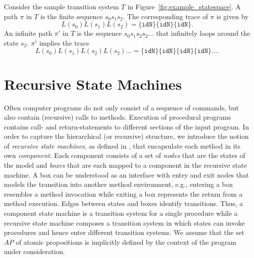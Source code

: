 \documentclass[a4paper, 12pt, twoside]{report}
\begin{document}
	Consider the sample transition system $T$ in Figure~\ref{fig:example_statespace}. A path $\pi$ in $T$ is the finite sequence $s_0s_1s_2$. The corresponding trace of $\pi$ is given by \[L(s_0)L(s_1)L(s_2) = \{\texttt{idN}\}\{\texttt{idN}\}\{\texttt{idN}\}.\] 
	An infinite path $\pi'$ in $T$ is the sequence $s_0s_1s_2s_2\dots$ that infinitely loops around the state $s_2$. $\pi'$ implies the trace  
	\[L(s_0)L(s_1)L(s_2)L(s_2)\dots = \{\texttt{idN}\}\{\texttt{idN}\}\{\texttt{idN}\}\{\texttt{idN}\}\dots.\]

	\section{Recursive State Machines}\label{sec:rsm}
	
	Often computer programs do not only consist of a sequence of commands, but also contain (recursive) calls to methods. Execution of procedural programs contains call- and return-statements to different sections of the input program. In order to capture the hierarchical (or recursive) structure, we introduce the notion of \textit{recursive state machines}, as defined in \cite{alur2001analysis}, that encapsulate each method in its own \textit{component}. Each component consists of a set of \textit{nodes} that are the states of the model and \textit{boxes} that are each mapped to a component in the recursive state machine. A box can be understood as an interface with entry and exit nodes that models the transition into another method environment, e.g., entering a box resembles a method invocation while exiting a box represents the return from a method execution. Edges between states and boxes identify transitions. Thus, a component state machine is a transition system for a single procedure while a recursive state machine composes a transition system in which states can invoke procedures and hence enter different transition systems. We assume that the set $AP$ of atomic propositions is implicitly defined by the context of the program under consideration.
	
\end{document}
